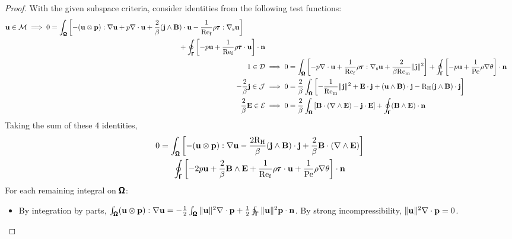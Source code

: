     \begin{proof}
        With the given subspace criteria, consider identities from the following test functions:
        \begin{align}
            \begin{split}
                \mathbf{u}  \in  \mathcal{M}  &\implies
                0  =  \int_{\pmb{\mathsf{\Omega}}}\left[- (\mathbf{u}\otimes\mathbf{p}):\nabla\mathbf{u} + p\nabla\cdot\mathbf{u} + \frac{2}{\beta}(\mathbf{j}\wedge\mathbf{B})\cdot\mathbf{u} - \frac{1}{\mathrm{Re}_{\mathrm{f}}}\rho\pmb{\mathsf{\tau}}:\nabla_{\mathrm{s}}\mathbf{u}\right]  \\
                &\;\;\;\;\;\;\;\;\;\;\;\;\;\;\;\;\;\;\;\;\;\;\;\;\;\;\;\;\;\;\;\;\;\;\;\;\;\;\;\;\;\;\;\;\;\;\;\;\;\;\;\;\;\;\;\;\;\;\;\;\;\;\;\;\;\;\;\;\;\;\;\;\;\;\;\;\;+ \oint_{\pmb{\mathsf{\Gamma}}}\left[- p\mathbf{u} + \frac{1}{\mathrm{Re}_{\mathrm{f}}}\rho\pmb{\mathsf{\tau}}\cdot\mathbf{u}\right]\cdot\mathbf{n}
            \end{split}  \\
            1  \in  \mathcal{D}  &\implies
            0  =  \int_{\pmb{\mathsf{\Omega}}}\left[- p\nabla\cdot\mathbf{u} + \frac{1}{\mathrm{Re}_{\mathrm{f}}}\rho\pmb{\mathsf{\tau}}:\nabla_{\mathrm{s}}\mathbf{u} + \frac{2}{\beta\mathrm{Re}_{\mathrm{m}}}\|\mathbf{j}\|^{2}\right] + \oint_{\pmb{\mathsf{\Gamma}}}\left[- p\mathbf{u} + \frac{1}{\mathrm{Pe}}\rho\nabla\theta\right]\cdot\mathbf{n}  \\
            - \frac{2}{\beta}\mathbf{j}  \in  \mathcal{J}  &\implies
            0  =  \frac{2}{\beta}\int_{\pmb{\mathsf{\Omega}}}\left[- \frac{1}{\mathrm{Re}_{\mathrm{m}}}\|\mathbf{j}\|^{2} + \mathbf{E}\cdot\mathbf{j} + (\mathbf{u}\wedge\mathbf{B})\cdot\mathbf{j} - \mathrm{R}_{\mathrm{H}}(\mathbf{j}\wedge\mathbf{B})\cdot\mathbf{j}\right]  \\
            \frac{2}{\beta}\mathbf{E}  \in  \mathcal{E}  &\implies
            0  =  \frac{2}{\beta}\int_{\pmb{\mathsf{\Omega}}}\left[\mathbf{B}\cdot(\nabla\wedge\mathbf{E}) - \mathbf{j}\cdot\mathbf{E}\right] + \oint_{\pmb{\mathsf{\Gamma}}}(\mathbf{B}\wedge\mathbf{E})\cdot\mathbf{n}
        \end{align}
        Taking the sum of these 4 identities,
        \begin{multline}
            0  =  \int_{\pmb{\mathsf{\Omega}}}\left[- (\mathbf{u}\otimes\mathbf{p}):\nabla\mathbf{u} - \frac{2\mathrm{R}_{\mathrm{H}}}{\beta}(\mathbf{j}\wedge\mathbf{B})\cdot\mathbf{j} + \frac{2}{\beta}\mathbf{B}\cdot(\nabla\wedge\mathbf{E})\right]  \\
            \oint_{\pmb{\mathsf{\Gamma}}}\left[- 2p\mathbf{u} + \frac{2}{\beta}\mathbf{B}\wedge\mathbf{E} + \frac{1}{\mathrm{Re}_{\mathrm{f}}}\rho\pmb{\mathsf{\tau}}\cdot\mathbf{u} + \frac{1}{\mathrm{Pe}}\rho\nabla\theta\right]\cdot\mathbf{n}
        \end{multline}
        For each remaining integral on $\pmb{\mathsf{\Omega}}$:
        \begin{itemize}
            \item  By integration by parts, $\int_{\pmb{\mathsf{\Omega}}}(\mathbf{u}\otimes\mathbf{p}):\nabla\mathbf{u}  =  - \frac{1}{2}\int_{\pmb{\mathsf{\Omega}}}\|\mathbf{u}\|^{2}\nabla\cdot\mathbf{p} + \frac{1}{2}\oint_{\pmb{\mathsf{\Gamma}}}\|\mathbf{u}\|^{2}\mathbf{p}\cdot\mathbf{n}$. By strong incompressibility, $\|\mathbf{u}\|^{2}\nabla\cdot\mathbf{p}  =  0$.

\end{itemize}
\end{proof}

